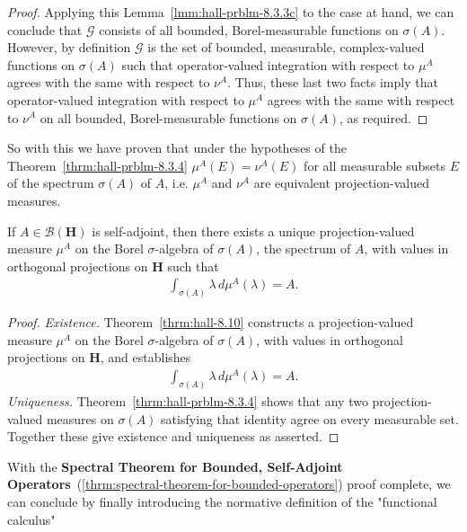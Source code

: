 \begin{proof}
Applying this Lemma~\ref{lmm:hall-prblm-8.3.3c} to the case at hand, we can conclude that $\mathcal{G}$ consists of all bounded, Borel-measurable functions on $\sigma(A)$. However, by definition $\mathcal{G}$ is the set of bounded, measurable, complex-valued functions on $\sigma(A)$ such that operator-valued integration with respect to $\mu^A$ agrees with the same with respect to $\nu^A$. Thus, these last two facts imply that operator-valued integration with respect to $\mu^A$ agrees with the same with respect to $\nu^A$ on all bounded, Borel-measurable functions on $\sigma(A)$, as required.
\end{proof}

So with this we have proven that under the hypotheses of the Theorem~\ref{thrm:hall-prblm-8.3.4} $\mu^A(E) = \nu^A(E)$ for all measurable subsets $E$ of the spectrum $\sigma(A)$ of $A$, i.e. $\mu^A$ and $\nu^A$ are equivalent projection-valued measures.

\begin{theorem}
    \label{thrm:spectral-theorem-for-bounded-operators}
    \leanok
    If $A \in \mathcal{B}(\mathbf{H})$ is self-adjoint, then there exists a unique projection-valued measure $\mu^A$ on the Borel $\sigma$-algebra of $\sigma(A)$, the spectrum of $A$, with values in orthogonal projections on $\mathbf{H}$ such that
    \begin{align}
        \int_{\sigma(A)} \lambda \, d\mu^A(\lambda) = A.
    \end{align}
\end{theorem}
\begin{proof}
    \leanok
\textit{Existence.} Theorem~\ref{thrm:hall-8.10} constructs a projection-valued measure $\mu^A$ on the Borel $\sigma$-algebra of $\sigma(A)$, with values in orthogonal projections on $\mathbf{H}$, and establishes
\begin{align}
    \int_{\sigma(A)} \lambda \, d\mu^A(\lambda) = A.
\end{align}
\textit{Uniqueness.} Theorem~\ref{thrm:hall-prblm-8.3.4} shows that any two projection-valued measures on $\sigma(A)$ satisfying that identity agree on every measurable set. Together these give existence and uniqueness as asserted.
\end{proof}

With the \textbf{Spectral Theorem for Bounded, Self-Adjoint Operators}~(\ref{thrm:spectral-theorem-for-bounded-operators}) proof complete, we can conclude by finally introducing the normative definition of the "functional calculus"


